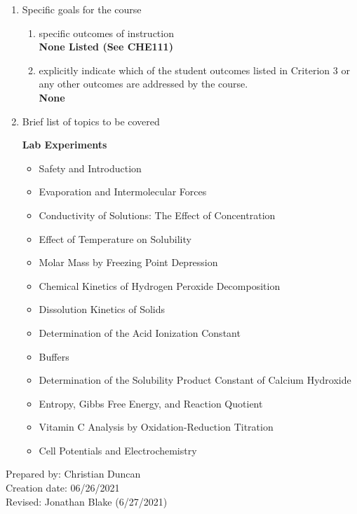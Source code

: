 \begin{enumerate}[1.]
\begin{enumerate}[a.]
\end{enumerate}

\item Specific goals for the course
\begin{enumerate}
\item specific outcomes of instruction\\ %
  {\bfseries
    None Listed (See CHE111)
  }

\item explicitly indicate which of the student outcomes listed in Criterion 3 or any other outcomes are addressed by the course.\\
  {\bfseries
    None
  }
\end{enumerate}

\item Brief list of topics to be covered\\
  {\bfseries
    Lab Experiments
    \begin{itemize}
      \item Safety and Introduction
      \item Evaporation and Intermolecular Forces
      \item Conductivity of Solutions: The Effect of Concentration
      \item Effect of Temperature on Solubility
      \item Molar Mass by Freezing Point Depression
      \item Chemical Kinetics of Hydrogen Peroxide Decomposition
      \item Dissolution Kinetics of Solids
      \item Determination of the Acid Ionization Constant
      \item Buffers
      \item Determination of the Solubility Product Constant of Calcium Hydroxide
      \item Entropy, Gibbs Free Energy, and Reaction Quotient
      \item Vitamin C Analysis by Oxidation-Reduction Titration
      \item Cell Potentials and Electrochemistry
    \end{itemize}
  }

\end{enumerate}

\noindent Prepared by: Christian Duncan\\
\noindent Creation date: 06/26/2021\\
\noindent Revised: Jonathan Blake (6/27/2021)\\
